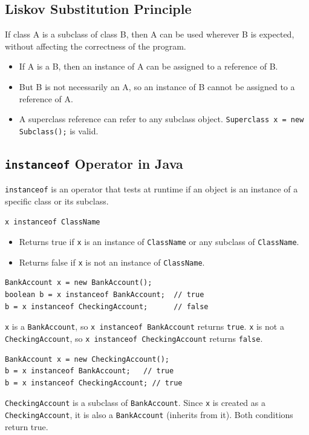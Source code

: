 \documentclass[letterpaper,12pt]{article}
\begin{document}
\subsection{Liskov Substitution Principle}
If class A is a subclass of class B, then A can be used wherever B is expected, without affecting the correctness of the program.
\begin{itemize}
    \item If A is a B, then an instance of A can be assigned to a reference of B.
    \item But B is not necessarily an A, so an instance of B cannot be assigned to a reference of A.
    \item A superclass reference can refer to any subclass object. \texttt{Superclass x = new Subclass();} is valid.
\end{itemize}

\subsection{\texttt{instanceof} Operator in Java}
\texttt{instanceof} is an operator that tests at runtime if an object is an instance of a specific class or its subclass.
\begin{verbatim}
x instanceof ClassName
\end{verbatim}
\begin{itemize}
    \item Returns true if \texttt{x} is an instance of \texttt{ClassName} or any subclass of \texttt{ClassName}.
    \item Returns false if \texttt{x} is not an instance of \texttt{ClassName}.
\end{itemize}
\begin{verbatim}
BankAccount x = new BankAccount();
boolean b = x instanceof BankAccount;  // true
b = x instanceof CheckingAccount;      // false
\end{verbatim}
\texttt{x} is a \texttt{BankAccount}, so \texttt{x instanceof BankAccount} returns \texttt{true}. \texttt{x} is not a \texttt{CheckingAccount}, so \texttt{x instanceof CheckingAccount} returns \texttt{false}.
\begin{verbatim}
BankAccount x = new CheckingAccount();
b = x instanceof BankAccount;   // true
b = x instanceof CheckingAccount; // true
\end{verbatim}
\texttt{CheckingAccount} is a subclass of \texttt{BankAccount}. Since \texttt{x} is created as a \texttt{CheckingAccount}, it is also a \texttt{BankAccount} (inherits from it). Both conditions return true.
\end{document}

